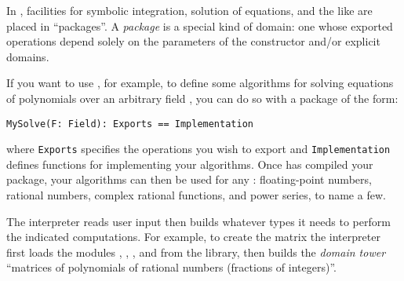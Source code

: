 
\par %
In \Language{}, facilities for symbolic integration, solution of equations, and the like
are placed in ``packages''.
A {\it package}
is a special kind of domain: one whose exported operations
depend solely on the parameters of the constructor and/or
explicit domains.

If you want to use \Language{}, for example, to define some algorithms for solving
equations of polynomials over an arbitrary field , you
can do so with a package of the form:

\begin{verbatim}
MySolve(F: Field): Exports == Implementation
\end{verbatim}

where {\tt Exports} specifies the  operations you wish to
export and {\tt Implementation} defines functions for implementing your algorithms.
Once \Language{} has compiled your package, your algorithms can then be used
for any : floating-point numbers, rational numbers, complex
rational functions, and power series, to name a few.



\par %
The \Language{} interpreter reads user input then builds whatever types
it needs to perform the indicated computations.
For example, to create the matrix
%
\texht{\[M = \begin{pmatrix}x^2+1&0\\0&x / 2\end{pmatrix}\]}
{}
%
the interpreter first loads the
modules , , ,
and  from the library, then builds the {\it domain tower}
``matrices of polynomials of rational numbers (fractions of integers)''.

